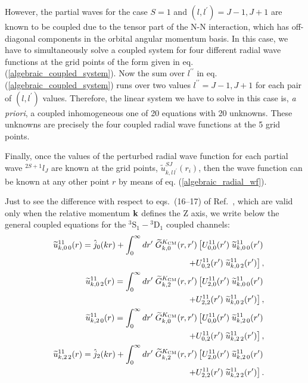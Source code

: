 \documentclass[aps,twocolumn,showpacs,preprintnumbers,amsmath,amssymb,nofootinbib,superscriptaddress,showkeys,noeprint]{revtex4-1}
\newcommand{\nk}{{\bf k}}
\begin{document}
However, the partial waves for the case $S=1$ and
$(l,l^\prime)=J-1,J+1$ are known to be coupled due to the tensor part
of the N-N interaction, which has off-diagonal components in the
orbital angular momentum basis. In this case, we have to
simultaneously solve a coupled system for four different radial wave
functions at the grid points of the form given in eq.
(\ref{algebraic_coupled_system}). Now the sum over $l^{\prime\prime}$
in eq. (\ref{algebraic_coupled_system}) runs over two values
$l^{\prime\prime}=J-1,J+1$ for each pair of $(l,l^\prime)$
values. Therefore, the linear system we have to solve in this case is,
\emph{a priori}, a coupled inhomogeneous one of 20 equations with 20
unknowns. These unknowns are precisely the four coupled radial wave
functions at the 5 grid points.

Finally, once the values of the perturbed radial wave function for
each partial wave ${}^{2S+1}l_J$ are known at the grid points,
$\widetilde{u}^{SJ}_{k,l\,l^\prime}(r_i)$, then the wave function can
be known at any other point $r$ by means of eq.
(\ref{algebraic_radial_wf}).

Just to see the difference with respect to eqs.~(16--17) of
Ref.~\cite{RuizSimo:2017tcb}, which are valid only when the relative
momentum $\nk$ defines the Z axis, we write below the general coupled
equations for the ${}^3$S${}_1-{}^3$D${}_1$ coupled channels:
\begin{eqnarray}
&&\widetilde{u}^{11}_{k,0\,0}(r)=
\hat{j}_0(kr)+ \int^{\infty}_0 dr^\prime \; 
\widetilde{G}^{K_{\rm CM}}_{k,0}(r,r^\prime)
\left[U^{11}_{0,0}(r^\prime)\;
\widetilde{u}^{11}_{k,0\,0}(r^\prime)\right.\nonumber\\
&&\left. + U^{11}_{0,2}(r^\prime)\;
\widetilde{u}^{11}_{k,0\,2}(r^\prime)\right],\label{eqs:coupled_3S1-3D1-radial_1}\\
&&\widetilde{u}^{11}_{k,0\,2}(r)= \int^{\infty}_0 dr^\prime \; 
\widetilde{G}^{K_{\rm CM}}_{k,2}(r,r^\prime)
\left[U^{11}_{2,0}(r^\prime)\;
\widetilde{u}^{11}_{k,0\,0}(r^\prime)\right.\nonumber\\
&&\left. + U^{11}_{2,2}(r^\prime)\;
\widetilde{u}^{11}_{k,0\,2}(r^\prime)\right],\label{eqs:coupled_3S1-3D1-radial_2}\\
&&\widetilde{u}^{11}_{k,2\,0}(r)= \int^{\infty}_0 dr^\prime \; 
\widetilde{G}^{K_{\rm CM}}_{k,0}(r,r^\prime)
\left[U^{11}_{0,0}(r^\prime)\;
\widetilde{u}^{11}_{k,2\,0}(r^\prime)\right.\nonumber\\
&&\left. + U^{11}_{0,2}(r^\prime)\;
\widetilde{u}^{11}_{k,2\,2}(r^\prime)\right],\label{eqs:coupled_3S1-3D1-radial_3}\\
&&\widetilde{u}^{11}_{k,2\,2}(r)= 
\hat{j}_2(kr) + \int^{\infty}_0 dr^\prime \; 
\widetilde{G}^{K_{\rm CM}}_{k,2}(r,r^\prime)
\left[U^{11}_{2,0}(r^\prime)\;
\widetilde{u}^{11}_{k,2\,0}(r^\prime)\right.\nonumber\\
&&\left. + U^{11}_{2,2}(r^\prime)\;
\widetilde{u}^{11}_{k,2\,2}(r^\prime)\right].\label{eqs:coupled_3S1-3D1-radial_4}
\end{eqnarray}
\end{document}
